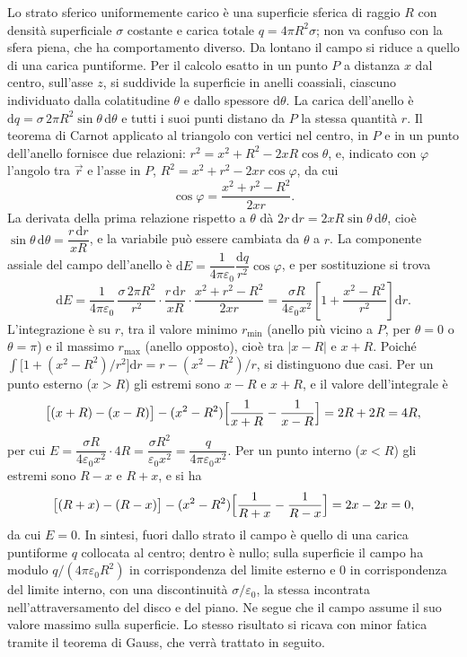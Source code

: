 \documentclass[11pt,a4paper]{article}
\newcommand{\dd}{\mathrm{d}}
\newcommand{\epz}{\varepsilon_0}
\begin{document}
Lo strato sferico uniformemente carico è una superficie sferica di raggio $R$ con densità superficiale $\sigma$ costante e carica totale $q=4\pi R^2\sigma$; non va confuso con la sfera piena, che ha comportamento diverso. Da lontano il campo si riduce a quello di una carica puntiforme. Per il calcolo esatto in un punto $P$ a distanza $x$ dal centro, sull'asse $z$, si suddivide la superficie in anelli coassiali, ciascuno individuato dalla colatitudine $\theta$ e dallo spessore $\dd\theta$. La carica dell'anello è $\dd q=\sigma\,2\pi R^2\sin\theta\,\dd\theta$ e tutti i suoi punti distano da $P$ la stessa quantità $r$. Il teorema di Carnot applicato al triangolo con vertici nel centro, in $P$ e in un punto dell'anello fornisce due relazioni: $r^2=x^2+R^2-2xR\cos\theta$, e, indicato con $\varphi$ l'angolo tra $\vec r$ e l'asse in $P$, $R^2=x^2+r^2-2xr\cos\varphi$, da cui
\[
\cos\varphi=\frac{x^2+r^2-R^2}{2xr}.
\]
La derivata della prima relazione rispetto a $\theta$ dà $2r\,\dd r=2xR\sin\theta\,\dd\theta$, cioè $\sin\theta\,\dd\theta=\dfrac{r\,\dd r}{xR}$, e la variabile può essere cambiata da $\theta$ a $r$. La componente assiale del campo dell'anello è $\dd E=\dfrac{1}{4\pi\epz}\dfrac{\dd q}{r^2}\cos\varphi$, e per sostituzione si trova
\[
\dd E=\frac{1}{4\pi\epz}\,\frac{\sigma\,2\pi R^2}{r^2}\cdot\frac{r\,\dd r}{xR}\cdot\frac{x^2+r^2-R^2}{2xr}
=\frac{\sigma R}{4\epz x^2}\left[1+\frac{x^2-R^2}{r^2}\right]\dd r .
\]
L'integrazione è su $r$, tra il valore minimo $r_{\min}$ (anello più vicino a $P$, per $\theta=0$ o $\theta=\pi$) e il massimo $r_{\max}$ (anello opposto), cioè tra $|x-R|$ e $x+R$. Poiché $\int\bigl[1+(x^2-R^2)/r^2\bigr]\dd r=r-(x^2-R^2)/r$, si distinguono due casi. Per un punto esterno ($x>R$) gli estremi sono $x-R$ e $x+R$, e il valore dell'integrale è
\[
\bigl[(x+R)-(x-R)\bigr]-(x^2-R^2)\Bigl[\frac{1}{x+R}-\frac{1}{x-R}\Bigr]=2R+2R=4R,
\]
per cui $E=\dfrac{\sigma R}{4\epz x^2}\cdot4R=\dfrac{\sigma R^2}{\epz x^2}=\dfrac{q}{4\pi\epz x^2}$. Per un punto interno ($x<R$) gli estremi sono $R-x$ e $R+x$, e si ha
\[
\bigl[(R+x)-(R-x)\bigr]-(x^2-R^2)\Bigl[\frac{1}{R+x}-\frac{1}{R-x}\Bigr]=2x-2x=0,
\]
da cui $E=0$. In sintesi, fuori dallo strato il campo è quello di una carica puntiforme $q$ collocata al centro; dentro è nullo; sulla superficie il campo ha modulo $q/(4\pi\epz R^2)$ in corrispondenza del limite esterno e $0$ in corrispondenza del limite interno, con una discontinuità $\sigma/\epz$, la stessa incontrata nell'attraversamento del disco e del piano. Ne segue che il campo assume il suo valore massimo sulla superficie. Lo stesso risultato si ricava con minor fatica tramite il teorema di Gauss, che verrà trattato in seguito.
\end{document}
